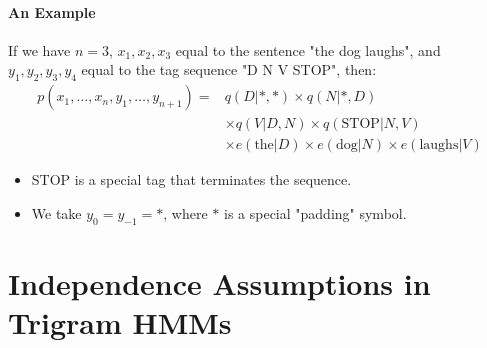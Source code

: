 \paragraph{An Example}
  If we have $n = 3$, $x_1, x_2, x_3$ equal to the sentence "the dog laughs", and $y_1, y_2, y_3, y_4$ equal to the tag sequence "D N V STOP", then:
\[
\begin{aligned}
p(x_1, \ldots, x_n, y_1, \ldots, y_{n+1}) = & q(D|*,*) \times q(N|*,D) \\
& \times q(V|D,N) \times q(\text{STOP}|N,V) \\
& \times e(\text{the}|D) \times e(\text{dog}|N) \times e(\text{laughs}|V)
\end{aligned}
\]
  \begin{itemize}
    \item STOP is a special tag that terminates the sequence.
    \item We take $y_0 = y_{-1} = *$, where $*$ is a special "padding" symbol.
  \end{itemize}


\section{Independence Assumptions in Trigram HMMs}

